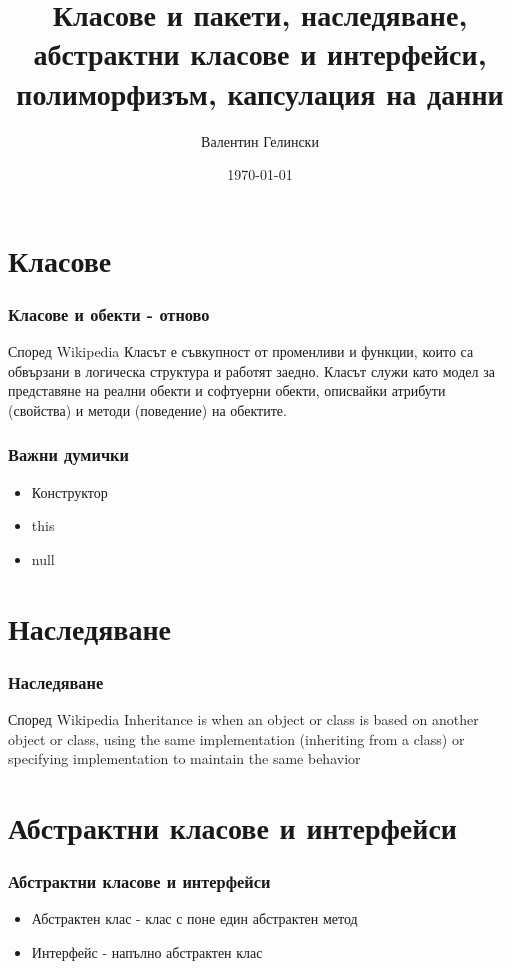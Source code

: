 \documentclass{beamer}
\title{Класове и пакети, наследяване, абстрактни класове и интерфейси, полиморфизъм, капсулация на данни}
\author{Валентин Гелински}
\institute{ТУ София}
\date{\today}
\begin{document}
  \begin{frame} 
    \titlepage
  \end{frame}

  \section{Класове}

  \begin{frame} 
    \frametitle{Класове и обекти - отново}
     \begin{block}{Според Wikipedia}
       Класът е съвкупност от променливи и функции, които са обвързани в логическа структура и работят заедно. Класът служи като модел за представяне на реални обекти и софтуерни обекти, описвайки атрибути (свойства) и методи (поведение) на обектите.
     \end{block}
  \end{frame}

  \begin{frame}
    \frametitle{Важни думички}
    \begin{itemize}
      \item{Конструктор}
      \item{this}
      \item{null}
    \end{itemize}
  \end{frame}

  \section{Наследяване}

  \begin{frame}
    \frametitle{Наследяване}
    \begin{block}{Според Wikipedia}
      Inheritance is when an object or class is based on another object or class, using the same implementation (inheriting from a class) or specifying implementation to maintain the same behavior 
    \end{block}
  \end{frame}

  \section{Абстрактни класове и интерфейси}

  \begin{frame}
    \frametitle{Абстрактни класове и интерфейси}
    \begin{itemize}
      \item{Абстрактен клас - клас с поне един абстрактен метод}
      \item{Интерфейс - напълно абстрактен клас}
    \end{itemize}
  \end{frame}
\end{document}
